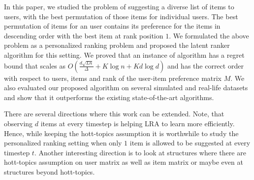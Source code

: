 In this paper, we studied the problem of suggesting a diverse list of items to users, with the best permutation of those items for individual users. The best permutation of items for an user contains its preference for the items in descending order with the best item at rank position $1$. We formulated the above problem as a personalized ranking problem and proposed the latent ranker algorithm for this setting. We proved that an instance of algorithm has  a regret bound that scales as $O\left(\frac{d \sqrt{L n}}{\Delta} + K \log n + K d \log d\right)$ and has the correct order with respect to users, items and rank of the user-item preference matrix $M$. We also evaluated our proposed algorithm on several simulated and real-life datasets and show that it outperforms the existing state-of-the-art algorithms.

There are several directions where this work can be extended. Note, that observing $d$ items at every timestep is helping LRA to learn more efficiently. Hence,  while keeping the hott-topics assumption it is worthwhile to study the personalized ranking setting when only $1$ item is allowed to be suggested at every timestep $t$. Another interesting direction is to look at structures where there are hott-topics assumption on user matrix as well as item matrix or maybe even at structures beyond hott-topics.
